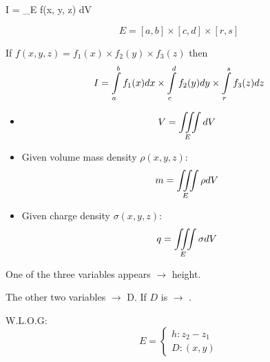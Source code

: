 \clearpage

\begin{multicols}{3}


  \par {}
    \begin{eqbox}
      I = \IIINT_{E} f(x, y, z) dV
    \end{eqbox}

      \begin{equation*}
        E = [a, b] \times [c, d] \times [r, s]
      \end{equation*}

      \par If $f(x, y, z) = f_{1}(x) \times f_{2}(y) \times f_{3}(z)$
        then
        \begin{equation}
          I = \int \limits_{a}^{b} f_{1}(x)dx \times
              \int \limits_{c}^{d} f_{2}(y)dy \times
              \int \limits_{r}^{s} f_{3}(z)dz
        \end{equation}

      \begin{itemize}
        \item {}
          \begin{equation*}
            V = \iiint \limits_{E} dV
          \end{equation*}
        \item {}
          \par Given volume mass density $\rho(x, y, z)$:
          \begin{equation*}
            m = \iiint \limits_{E} \rho dV
          \end{equation*}
        \item {}
          \par Given charge density $\sigma(x, y, z)$:
          \begin{equation*}
            q = \iiint \limits_{E} \sigma dV
          \end{equation*}
      \end{itemize}

\colbreak

      \par One of the three variables appears  $\to$ height.
      \par The other two variables $\to$ D. If $D$ is 
        $\to$ .
      \par W.L.O.G:
        \footnotemark
        \begin{equation*}
          E =
          \begin{cases}
            h: z_{2} - z_{1} \\
            D: (x, y)
          \end{cases}
        \end{equation*}


\end{multicols}

